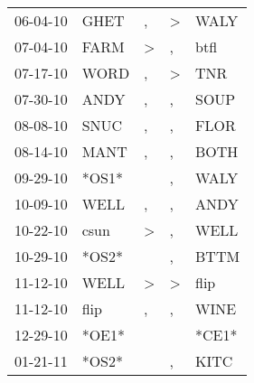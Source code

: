 \begin{supertabular}{p{0.07\textwidth}p{0.06\textwidth}p{0.02\textwidth}p{0.02\textwidth}p{0.06\textwidth}}
          06-04-10\textsuperscript{} &           GHET\textsuperscript{} &                , &     \textgreater &           WALY\textsuperscript{} \\
          07-04-10\textsuperscript{} &           FARM\textsuperscript{} &     \textgreater &                , &           btfl\textsuperscript{} \\
          07-17-10\textsuperscript{} &           WORD\textsuperscript{} &                , &     \textgreater &            TNR\textsuperscript{} \\
          07-30-10\textsuperscript{} &           ANDY\textsuperscript{} &                , &                , &           SOUP\textsuperscript{} \\
          08-08-10\textsuperscript{} &           SNUC\textsuperscript{} &                , &                , &           FLOR\textsuperscript{} \\
          08-14-10\textsuperscript{} &           MANT\textsuperscript{} &                , &                , &           BOTH\textsuperscript{} \\
          09-29-10\textsuperscript{} &                            *OS1* &                  &                , &           WALY\textsuperscript{} \\
          10-09-10\textsuperscript{} &           WELL\textsuperscript{} &                , &                , &           ANDY\textsuperscript{} \\
          10-22-10\textsuperscript{} &           csun\textsuperscript{} &     \textgreater &                , &           WELL\textsuperscript{} \\
          10-29-10\textsuperscript{} &                            *OS2* &                  &                , &           BTTM\textsuperscript{} \\
          11-12-10\textsuperscript{} &           WELL\textsuperscript{} &     \textgreater &     \textgreater &           flip\textsuperscript{} \\
          11-12-10\textsuperscript{} &           flip\textsuperscript{} &                , &                , &           WINE\textsuperscript{} \\
          12-29-10\textsuperscript{} &                            *OE1* &                  &                  &                            *CE1* \\
          01-21-11\textsuperscript{} &                            *OS2* &                  &                , &           KITC\textsuperscript{} \\

\end{supertabular}
